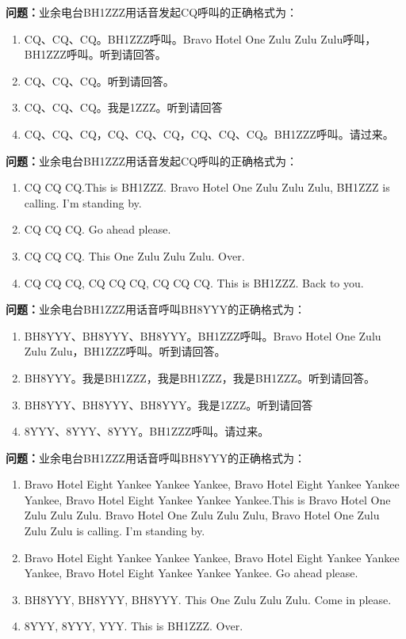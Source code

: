 \textbf{问题：}业余电台BH1ZZZ用话音发起CQ呼叫的正确格式为：
\begin{enumerate}[label=\Alph*), leftmargin=1cm]
	\item CQ、CQ、CQ。BH1ZZZ呼叫。Bravo Hotel One Zulu Zulu Zulu呼叫，BH1ZZZ呼叫。听到请回答。
	\item CQ、CQ、CQ。听到请回答。
	\item CQ、CQ、CQ。我是1ZZZ。听到请回答
	\item CQ、CQ、CQ，CQ、CQ、CQ，CQ、CQ、CQ。BH1ZZZ呼叫。请过来。
\end{enumerate}

\textbf{问题：}业余电台BH1ZZZ用话音发起CQ呼叫的正确格式为：
\begin{enumerate}[label=\Alph*), leftmargin=1cm]
	\item CQ CQ CQ.This is BH1ZZZ. Bravo Hotel One Zulu Zulu Zulu, BH1ZZZ is calling. I’m standing by.
	\item CQ CQ CQ. Go ahead please.
	\item CQ CQ CQ. This One Zulu Zulu Zulu. Over.
	\item CQ CQ CQ, CQ CQ CQ, CQ CQ CQ. This is BH1ZZZ. Back to you.
\end{enumerate}

\textbf{问题：}业余电台BH1ZZZ用话音呼叫BH8YYY的正确格式为：
\begin{enumerate}[label=\Alph*), leftmargin=1cm]
	\item BH8YYY、BH8YYY、BH8YYY。BH1ZZZ呼叫。Bravo Hotel One Zulu Zulu Zulu，BH1ZZZ呼叫。听到请回答。
	\item BH8YYY。我是BH1ZZZ，我是BH1ZZZ，我是BH1ZZZ。听到请回答。
	\item BH8YYY、BH8YYY、BH8YYY。我是1ZZZ。听到请回答
	\item 8YYY、8YYY、8YYY。BH1ZZZ呼叫。请过来。
\end{enumerate}

\textbf{问题：}业余电台BH1ZZZ用话音呼叫BH8YYY的正确格式为：
\begin{enumerate}[label=\Alph*), leftmargin=1cm]
	\item Bravo Hotel Eight Yankee Yankee Yankee, Bravo Hotel Eight Yankee Yankee Yankee, Bravo Hotel Eight Yankee Yankee Yankee.This is Bravo Hotel One Zulu Zulu Zulu. Bravo Hotel One Zulu Zulu Zulu, Bravo Hotel One Zulu Zulu Zulu is calling. I’m standing by.
	\item Bravo Hotel Eight Yankee Yankee Yankee, Bravo Hotel Eight Yankee Yankee Yankee, Bravo Hotel Eight Yankee Yankee Yankee. Go ahead please.
	\item BH8YYY, BH8YYY, BH8YYY. This One Zulu Zulu Zulu. Come in please.
	\item 8YYY, 8YYY, YYY. This is BH1ZZZ. Over.
\end{enumerate}

